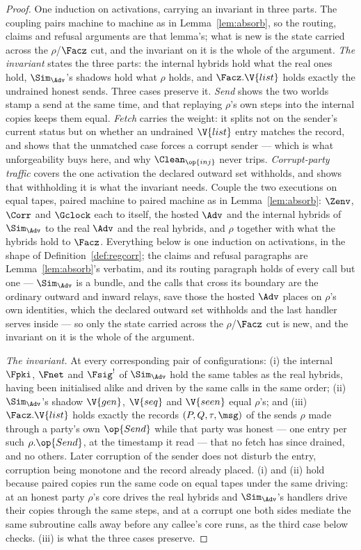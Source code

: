 \documentclass[10pt,oneside,openany]{book}
\theoremstyle{accentdef}
\theoremstyle{accentplain}
\begin{document}
\begin{proof}
One induction on activations, carrying an invariant in three parts. The coupling pairs machine to
machine as in Lemma~\ref{lem:absorb}, so the routing, claims and refusal arguments are that
lemma's; what is new is the state carried across the $\rho$/$\Facz$ cut, and the invariant on it is
the whole of the argument. \emph{The invariant} states the three parts: the internal hybrids hold
what the real ones hold, $\Sim_{\Adv}$'s shadows hold what $\rho$ holds, and $\Facz.\V{list}$ holds
exactly the undrained honest sends. Three cases preserve it. \emph{Send} shows the two worlds stamp
a send at the same time, and that replaying $\rho$'s own steps into the internal copies keeps them
equal. \emph{Fetch} carries the weight: it splits not on the sender's current status but on whether
an undrained $\V{list}$ entry matches the record, and shows that the unmatched case forces a
corrupt sender --- which is what unforgeability buys here, and why $\Clean_{\op{inj}}$ never trips.
\emph{Corrupt-party traffic} covers the one activation the declared outward set withholds, and
shows that withholding it is what the invariant needs.
Couple the two executions on equal tapes, paired machine to paired machine as in
Lemma~\ref{lem:absorb}: $\Zenv$, $\Corr$ and $\Gclock$ each to itself, the hosted $\Adv$ and the
internal hybrids of $\Sim_{\Adv}$ to the real $\Adv$ and the real hybrids, and $\rho$ together
with what the hybrids hold to $\Facz$. Everything below is one induction on activations, in the
shape of Definition~\ref{def:regcorr}; the claims and refusal paragraphs are
Lemma~\ref{lem:absorb}'s verbatim, and its routing paragraph holds of every call but one ---
$\Sim_{\Adv}$ is a bundle, and the calls that cross its boundary are the ordinary outward and
inward relays, save those the hosted $\Adv$ places on $\rho$'s own identities, which the declared
outward set withholds and the last handler serves inside --- so only the state carried across the
$\rho$/$\Facz$ cut is new, and the invariant on it is the whole of the argument.

\emph{The invariant.} At every corresponding pair of configurations: (i) the internal $\Fpki$,
$\Fnet$ and $\Fsig^{!}$ of $\Sim_{\Adv}$ hold the same tables as the real hybrids, having been
initialised alike and driven by the same calls in the same order; (ii) $\Sim_{\Adv}$'s shadow
$\V{gen}$, $\V{seq}$ and $\V{seen}$ equal $\rho$'s; and (iii) $\Facz.\V{list}$ holds exactly the
records $(P,Q,\tau,\msg)$ of the sends $\rho$ made through a party's own $\op{Send}$ while that
party was honest --- one entry per such $\rho.\op{Send}$, at the timestamp it read --- that no
fetch has since drained, and no others. Later corruption of the sender does not disturb the entry,
corruption being monotone and the record already placed. (i) and (ii) hold because paired copies
run the same code on equal tapes under the same driving: at an honest party $\rho$'s core drives
the real hybrids and $\Sim_{\Adv}$'s handlers drive their copies through the same steps, and at a
corrupt one both sides mediate the same subroutine calls away before any callee's core runs, as
the third case below checks. (iii) is what the three cases preserve.


\end{proof}
\end{document}
